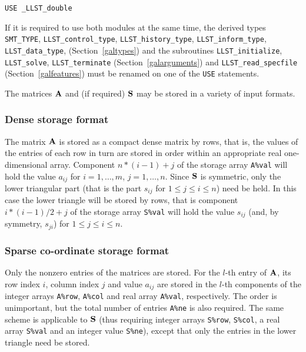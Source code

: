 \documentclass{galahad}
\newcommand{\packagename}{LLST}
\newcommand{\fullpackagename}{\libraryname\_\packagename}
\begin{document}
\medskip{}

\hskip0.5in {\tt USE  \fullpackagename\_double}

\medskip

\noindent
If it is required to use both modules at the same time, the derived types
{\tt SMT\_TYPE},
{\tt \packagename\_control\_type},
{\tt \packagename\_history\_\-type},
{\tt \packagename\_inform\_type},
{\tt \packagename\_data\_type},
(Section~\ref{galtypes})
and the subroutines
{\tt \packagename\_initialize},
{\tt \packagename\_solve}, {\tt \packagename\_\-terminate}
(Section~\ref{galarguments})
and
{\tt \packagename\_read\_specfile}
(Section~\ref{galfeatures})
must be renamed on one of the {\tt USE} statements.


\galmatrix
The matrices ${\mathbf{A}}$ and (if required) ${\mathbf{S}}$
may be stored in a variety of input formats.

\subsubsection{Dense storage format}\label{dense}
The matrix ${\mathbf{A}}$ is stored as a compact
dense matrix by rows, that is, the values of the entries of each row in turn are
stored in order within an appropriate real one-dimensional array.
Component $n \ast (i-1) + j$ of the storage array {\tt A\%val} will hold the
value $a_{ij}$ for $i = 1, \ldots , m$, $j = 1, \ldots , n$.
Since ${\mathbf{S}}$ is symmetric, only the lower triangular part (that is the part
$s_{ij}$ for $1 \leq j \leq i \leq n$) need be held. In this case
the lower triangle will be stored by rows, that is
component $i \ast (i-1)/2 + j$ of the storage array {\tt S\%val}
will hold the value $s_{ij}$ (and, by symmetry, $s_{ji}$)
for $1 \leq j \leq i \leq n$.

\subsubsection{Sparse co-ordinate storage format}\label{coordinate}
Only the nonzero entries of the matrices are stored. For the
$l$-th entry of ${\mathbf{A}}$, its row index $i$, column index $j$
and value $a_{ij}$
are stored in the $l$-th components of the integer arrays {\tt A\%row},
{\tt A\%col} and real array {\tt A\%val}, respectively.
The order is unimportant, but the total
number of entries {\tt A\%ne} is also required.
The same scheme is applicable to
${\mathbf{S}}$ (thus requiring integer arrays {\tt S\%row}, {\tt S\%col}, a real array
{\tt S\%val} and an integer value {\tt S\%ne}),
except that only the entries in the lower triangle need be stored.
\end{document}
